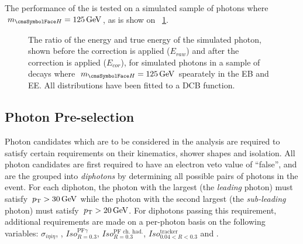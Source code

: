The performance of the \PhoEnergyBdt is tested on a simulated sample of \Hgg photons where $\mH=125\GeV$, as is show on \Fig~\ref{fig:reco:pho_regression}.

\begin{figure}[h]
\centering
\caption{The ratio of the \SC energy and true energy of the simulated photon, shown before the correction is applied ($E_{raw}$) and after the correction is applied ($E_{cor}$), for simulated photons in a sample of \Hgg decays where $\mH=125\GeV$ spearately in the EB and EE. All distributions have been fitted to a DCB function.}

\label{fig:reco:pho_regression}
\end{figure}


\subsection{Photon Pre-selection}
 \label{reco:sec:pho:preselection}

Photon candidates which are to be considered in the \Hgg analysis are required to satisfy certain requirements on their kinematics, shower shapes and isolation. All photon candidates are first required to have an electron veto value of ``false'', and are the grouped into \emph{diphotons} by determining all possible pairs of photons in the event. For each diphoton, the photon with the largest \pT (the \emph{leading} photon) must satisfy $\,p_\text{T}>30\,\text{Ge\hspace{-.08em}V}$ while the photon with the second largest \pT (the \emph{sub-leading} photon) must satisfy $\,p_\text{T}>20\,\text{Ge\hspace{-.08em}V}$. For diphotons passing this requirement, additional requirements are made on a per-photon basis on the following variables: $\sigma_{i\eta i\eta}$, \HoE, $Iso^{\textrm{PF}\gamma}_{R=0.3}$, $Iso^{\textrm{PF ch. had.}}_{R=0.3}$, $Iso^{\textrm{tracker}}_{0.04<R<0.3}$ and \RNINE. 

